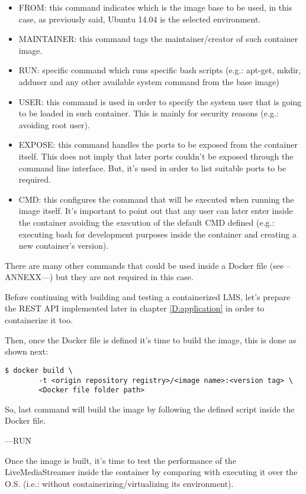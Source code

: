 \begin{itemize}
\item FROM: this command indicates which is the image base to be used, in this case, as previously said, Ubuntu 14.04 is the selected environment.
\item MAINTAINER: this command tags the maintainer/creator of such container image.
\item RUN: specific command which runs specific bash scripts (e.g.: apt-get, mkdir, adduser and any other available system command from the base image)
\item USER: this command is used in order to specify the system user that is going to be loaded in such container. This is mainly for security reasons (e.g.: avoiding root user).
\item EXPOSE: this command handles the ports to be exposed from the container itself. This does not imply that later ports couldn't be exposed through the command line interface. But, it's used in order to list suitable ports to be required. 
\item CMD: this configures the command that will be executed when running the image itself. It's important to point out that any user can later enter inside the container avoiding the execution of the default CMD defined (e.g.: executing bash for development purposes inside the container and creating a new container's version).
\end{itemize}

There are many other commands that could be used inside a Docker file (see --ANNEXX---) but they are not required in this case.

Before continuing with building and testing a containerized LMS, let's prepare the REST API implemented later in chapter \ref{D:application} in order to containerize it too.




Then, once the Docker file is defined it's time to build the image, this is done as shown next:

\begin{verbatim}
$ docker build \
		-t <origin repository registry>/<image name>:<version tag> \
		<Docker file folder path>
\end{verbatim}

So, last command will build the image by following the defined script inside the Docker file.


---RUN


Once the image is built, it's time to test the performance of the LiveMediaStreamer inside the container by comparing with executing it over the O.S. (i.e.: without containerizing/virtualizing its environment).

